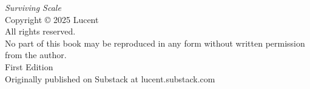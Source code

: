 \thispagestyle{empty}
\null\vfill
\begin{flushleft}
\textit{Surviving Scale}\\[0.5em]
Copyright © 2025 Lucent\\[0.5em]
All rights reserved.\\[1em]
No part of this book may be reproduced in any form without written permission from the author.\\[1em]
First Edition\\[2em]
\small Originally published on Substack at lucent.substack.com
\end{flushleft}
\clearpage
